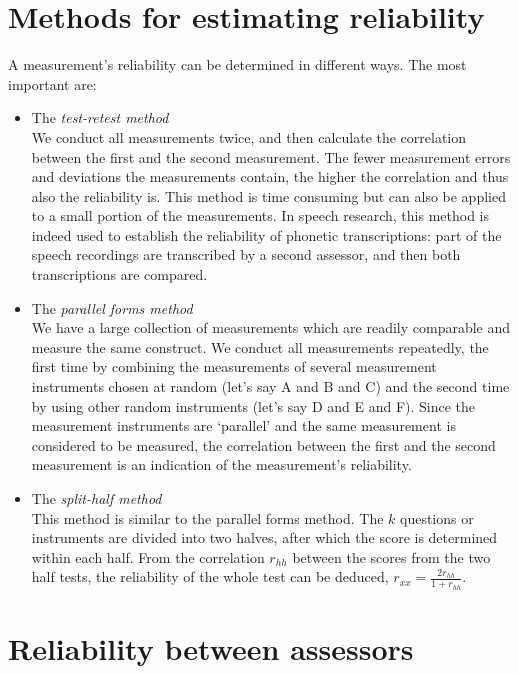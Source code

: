 \documentclass[
]{book}
\begin{document}
\hypertarget{methods-for-estimating-reliability}{%
\section{Methods for estimating reliability}\label{methods-for-estimating-reliability}}

A measurement's reliability can be determined in different ways.
The most important are:

\begin{itemize}
\item
  The \emph{test-retest method}\\
  We conduct all measurements twice, and then calculate the correlation
  between the first and the second measurement. The fewer measurement errors
  and deviations the measurements contain, the higher the correlation
  and thus also the reliability is. This method is
  time consuming but can also be applied to a small portion of the
  measurements. In speech research, this method is indeed used to establish
  the reliability of phonetic transcriptions: part of the speech
  recordings are transcribed by a second assessor, and then both transcriptions
  are compared.
\item
  The \emph{parallel forms method}\\
  We have a large collection of measurements which are readily
  comparable and measure the same construct. We conduct all
  measurements repeatedly, the first time by combining the measurements
  of several measurement instruments chosen at random (let's say A
  and B and C) and the second time by using other random
  instruments (let's say D and E and F). Since the measurement instruments are
  `parallel' and the same measurement is considered to be measured, the correlation
  between the first and the second measurement is an indication of the
  measurement's reliability.
\item
  The \emph{split-half method}\\
  This method is similar to the parallel forms method. The \(k\) questions
  or instruments are divided into two halves, after which the score
  is determined within each half. From the correlation \(r_{hh}\) between
  the scores from the two half tests, the reliability of the whole test can
  be deduced, \(r_{xx} = \frac{2r_{hh}}{1+r_{hh}}\).
\end{itemize}

\hypertarget{reliability-between-assessors}{%
\section{Reliability between assessors}\label{reliability-between-assessors}}
\end{document}
